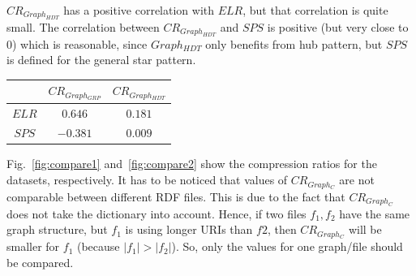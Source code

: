 $CR_{Graph_{HDT}}$ has a positive correlation with $ELR$, but that correlation is quite small. The correlation between $CR_{Graph_{HDT}}$ and $SPS$ is positive (but very close  to 0) which is reasonable, since $Graph_{HDT}$ only benefits from hub pattern, but $SPS$ is defined for the general star pattern.


\begin{center}
	\begin{tabular}{|c|c|c|}
		\hline 
		& $CR_{Graph_{GRP}}$ & $CR_{Graph_{HDT}}$ \\ 
		\hline 
		$ELR$ & $ 0.646 $ & $ 0.181 $  \\ 
		\hline 
		$SPS$ & $ -0.381 $ & $ 0.009 $ \\ 
		\hline 
	\end{tabular} 
	\label{tab:spearman}
\end{center}

Fig.~\ref{fig:compare1} and~\ref{fig:compare2} show the compression ratios for the datasets, respectively. It has to be noticed that values of $CR_{Graph_C}$ are not comparable between different RDF files. This is due to the fact that $CR_{Graph_C}$ does not take the dictionary into account. Hence, if two files $f_1,f_2$ have the same graph structure, but $f_1$  is using longer URIs than $f2$, then $CR_{Graph_C}$ will be smaller for $f_1$ (because $|f_1|>|f_2|$). So, only the values for one graph/file should be compared. 

